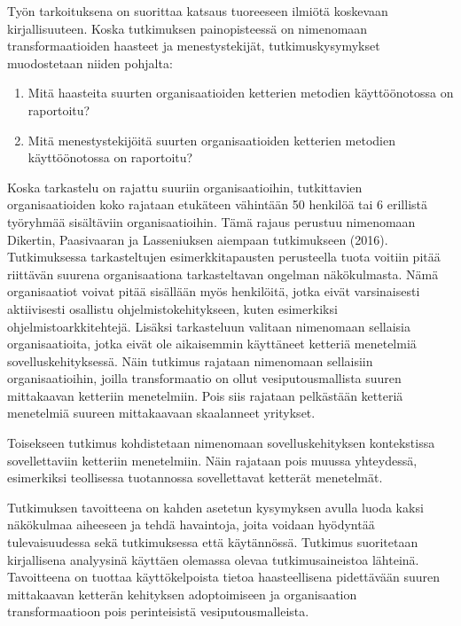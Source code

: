 Työn tarkoituksena on suorittaa katsaus tuoreeseen ilmiötä koskevaan
kirjallisuuteen. Koska tutkimuksen painopisteessä on nimenomaan
transformaatioiden haasteet ja menestystekijät, tutkimuskysymykset
muodostetaan niiden pohjalta:

\begin{enumerate}
	\item Mitä haasteita suurten organisaatioiden ketterien metodien
	käyttöönotossa on raportoitu?
	\item Mitä menestystekijöitä suurten organisaatioiden ketterien metodien
	käyttöönotossa on raportoitu?
\end{enumerate}


Koska tarkastelu on rajattu suuriin organisaatioihin, tutkittavien
organisaatioiden koko rajataan etukäteen vähintään 50 henkilöä tai
6 erillistä työryhmää sisältäviin organisaatioihin. Tämä rajaus
perustuu nimenomaan Dikertin, Paasivaaran ja Lasseniuksen aiempaan
tutkimukseen (2016). Tutkimuksessa tarkasteltujen esimerkkitapausten
perusteella tuota voitiin pitää riittävän suurena organisaationa
tarkasteltavan ongelman näkökulmasta. Nämä organisaatiot voivat
pitää sisällään myös henkilöitä, jotka eivät varsinaisesti
aktiivisesti osallistu ohjelmistokehitykseen, kuten esimerkiksi
ohjelmistoarkkitehtejä. Lisäksi tarkasteluun valitaan nimenomaan
sellaisia organisaatioita, jotka eivät ole aikaisemmin käyttäneet
ketteriä menetelmiä sovelluskehityksessä. Näin tutkimus rajataan
nimenomaan sellaisiin organisaatioihin, joilla transformaatio on ollut
vesiputousmallista suuren mittakaavan ketteriin menetelmiin. Pois siis
rajataan pelkästään ketteriä menetelmiä suureen mittakaavaan
skaalanneet yritykset.

Toisekseen tutkimus kohdistetaan nimenomaan sovelluskehityksen
kontekstissa sovellettaviin ketteriin menetelmiin. Näin rajataan pois
muussa yhteydessä, esimerkiksi teollisessa tuotannossa sovellettavat
ketterät menetelmät.

Tutkimuksen tavoitteena on kahden asetetun kysymyksen avulla luoda
kaksi näkökulmaa aiheeseen ja tehdä havaintoja, joita voidaan
hyödyntää tulevaisuudessa sekä tutkimuksessa että käytännössä.
Tutkimus suoritetaan kirjallisena analyysinä käyttäen olemassa olevaa
tutkimusaineistoa lähteinä. Tavoitteena on tuottaa käyttökelpoista
tietoa haasteellisena pidettävään suuren mittakaavan ketterän
kehityksen adoptoimiseen ja organisaation transformaatioon pois
perinteisistä vesiputousmalleista.
